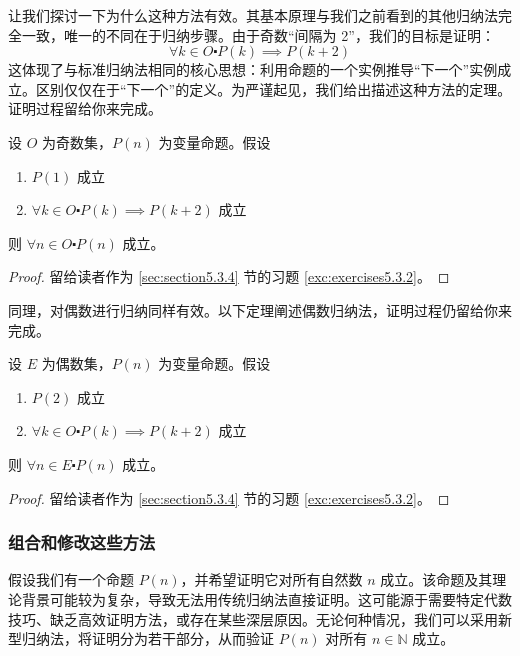 让我们探讨一下为什么这种方法有效。其基本原理与我们之前看到的其他归纳法完全一致，唯一的不同在于归纳步骤。由于奇数``间隔为 2''，我们的目标是证明：
\[\forall k \in O \centerdot P(k) \implies P(k + 2)\]
这体现了与标准归纳法相同的核心思想：利用命题的一个实例推导``下一个''实例成立。区别仅仅在于``下一个''的定义。为严谨起见，我们给出描述这种方法的定理。证明过程留给你来完成。

\begin{theorem}[奇数上的归纳]\label{theorem5.3.5}
    设 $O$ 为奇数集，$P(n)$ 为变量命题。假设

    \begin{enumerate}[label=(\arabic*)]
        \item $P(1)$ 成立
        \item $\forall k \in O \centerdot P(k) \implies P(k + 2)$ 成立
    \end{enumerate}

    则 $\forall n \in O \centerdot P(n)$ 成立。
\end{theorem}

\begin{proof}
    留给读者作为 \ref{sec:section5.3.4} 节的习题 \ref{exc:exercises5.3.2}。
\end{proof}

同理，对偶数进行归纳同样有效。以下定理阐述偶数归纳法，证明过程仍留给你来完成。

\begin{theorem}[偶数上的归纳]\label{theorem5.3.6}
    设 $E$ 为偶数集，$P(n)$ 为变量命题。假设

    \begin{enumerate}[label=(\arabic*)]
        \item $P(2)$ 成立
        \item $\forall k \in O \centerdot P(k) \implies P(k + 2)$ 成立
    \end{enumerate}

    则 $\forall n \in E \centerdot P(n)$ 成立。
\end{theorem}

\begin{proof}
    留给读者作为 \ref{sec:section5.3.4} 节的习题 \ref{exc:exercises5.3.2}。
\end{proof}

\subsubsection*{组合和修改这些方法}

假设我们有一个命题 $P(n)$，并希望证明它对所有自然数 $n$ 成立。该命题及其理论背景可能较为复杂，导致无法用传统归纳法直接证明。这可能源于需要特定代数技巧、缺乏高效证明方法，或存在某些深层原因。无论何种情况，我们可以采用新型归纳法，将证明分为若干部分，从而验证 $P(n)$ 对所有 $n \in \mathbb{N}$ 成立。

